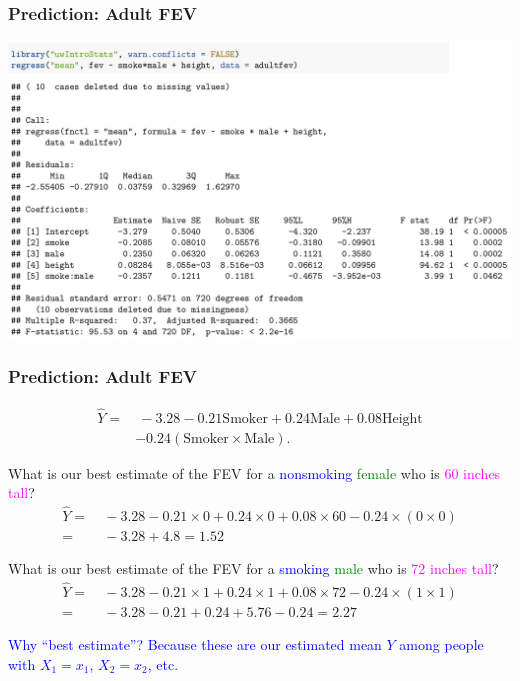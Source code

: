 \documentclass[12pt, 
hyperref={colorlinks=true, linkcolor=blue, urlcolor=cyan},dvipsnames]{beamer}
\begin{document}
\begin{frame}
\frametitle{Prediction: Adult FEV}
\includegraphics[width = 1.1\textwidth]{plots/predict_adult_fev.png}

\end{frame}

\begin{frame}
\frametitle{Prediction: Adult FEV}
\vspace{-0.5cm}
\begin{align*}
\widehat{Y} = & \ -3.28 - 0.21 \text{Smoker} + 0.24 \text{Male} + 0.08 \text{Height}\\
& - 0.24 (\text{Smoker}\times\text{Male}).
\end{align*}

What is our best estimate of the FEV for a \textcolor{blue}{nonsmoking} \textcolor{green}{female} who is \textcolor{magenta}{60 inches tall}? \pause
\begin{align*}
\widehat{Y} = & \ -3.28 - 0.21 \times 0 + 0.24 \times 0 + 0.08 \times 60 - 0.24 \times (0 \times 0) \\
=& \ -3.28 + 4.8 = 1.52
\end{align*} \pause

\vspace{-0.8cm}
What is our best estimate of the FEV for a \textcolor{blue}{smoking} \textcolor{green}{male} who is \textcolor{magenta}{72 inches tall}? \pause
\begin{align*}
\widehat{Y} = & \ -3.28 - 0.21 \times 1 + 0.24 \times 1 + 0.08 \times 72 - 0.24 \times (1 \times 1) \\
=& \ -3.28 -0.21 + 0.24 + 5.76 - 0.24 = 2.27
\end{align*} \pause

\vspace{-0.8cm}
\textcolor{blue}{Why ``best estimate''? Because these are our estimated mean $Y$ among people with $X_1 = x_1$, $X_2 = x_2$, etc.}
\end{frame}
\end{document}
